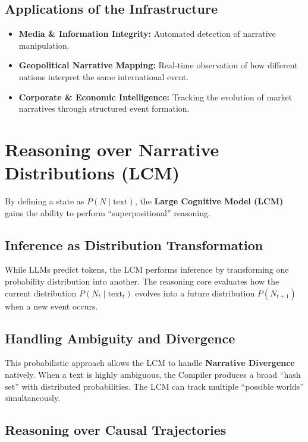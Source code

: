 \documentclass[11pt,a4paper]{article}
\begin{document}
\subsection{Applications of the Infrastructure}

\begin{itemize}[noitemsep]
  \item \textbf{Media \& Information Integrity:} Automated detection of narrative manipulation.
  \item \textbf{Geopolitical Narrative Mapping:} Real-time observation of how different nations interpret the same international event.
  \item \textbf{Corporate \& Economic Intelligence:} Tracking the evolution of market narratives through structured event formation.
\end{itemize}

\section{Reasoning over Narrative Distributions (LCM)}

By defining a state as $P(N \mid \text{text})$, the \textbf{Large
Cognitive Model (LCM)} gains the ability to perform ``superpositional''
reasoning.

\subsection{Inference as Distribution Transformation}

While LLMs predict tokens, the LCM performs inference by transforming
one probability distribution into another. The reasoning core evaluates
how the current distribution $P(N_t \mid \text{text}_t)$ evolves into a
future distribution $P(N_{t+1})$ when a new event occurs.

\subsection{Handling Ambiguity and Divergence}

This probabilistic approach allows the LCM to handle \textbf{Narrative
Divergence} natively. When a text is highly ambiguous, the Compiler
produces a broad ``hash set'' with distributed probabilities. The LCM
can track multiple ``possible worlds'' simultaneously.

\subsection{Reasoning over Causal Trajectories}
\end{document}

